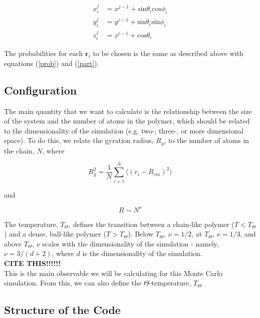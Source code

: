 \documentclass{article}
\begin{document}
\begin{multicols}{2}
\begin{equation}
\begin{split}
x^{j}_i & = x^{j-1} + \mathrm{sin}\theta _i \mathrm{cos}\phi _i \\
y^{j}_i & = y^{j-1} + \mathrm{sin} \theta _i \mathrm{sin} \phi _i \\
z^{j}_i & = z^{j-1} + \mathrm{cos} \theta _i
\end{split}
\end{equation}

\noindent The probabilities for each $\textbf{r}_i$ to be chosen is the same as described above with equations (\ref{prob}) and (\ref{part}).

\subsection{Configuration}

The main quantity that we want to calculate is the relationship between the size of the system and the number of atoms in the polymer, which should be related to the dimensionality of the simulation (e.g. two-, three-, or more dimensional space).  To do this, we relate the gyration radius, $R_g$, to the number of atoms in the chain, $N$, where 

\begin{equation}
\label{rg}
R_g^2 = \frac{1}{N} \sum \limits _{i=1}^{N} \langle (r_i - R_{cm})^2 \rangle
\end{equation} 

\noindent and 

\begin{equation}
\label{RNcomparison}
R \sim N^{\nu}
\end{equation}

The temperature, $T_{\Theta}$, defines the transition between a chain-like polymer ($T<T_{\Theta}$) and a dense, ball-like polymer ($T>T_{\Theta}$).  Below $T_{\Theta}$, $\nu = 1/ 2$, at $T_{\Theta}$, $\nu = 1/3$, and above $T_{\Theta}$, $\nu$ scales with the dimensionality of the simulation - namely, $\nu = 3/(d+2)$, where $d$ is the dimensionality of the simulation.  \\

\textbf{CITE THIS!!!!!!} \\

This is the main observable we will be calculating for this Monte Carlo simulation.  From this, we can also define the $\Theta $-temperature, $T_{\Theta}$.

\subsection{Structure of the Code}


\end{multicols}
\end{document}
